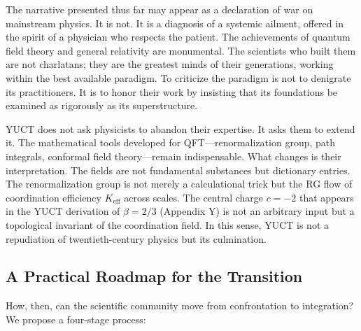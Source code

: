\documentclass[12pt,a4paper]{article}
\begin{document}
	The narrative presented thus far may appear as a declaration of war on mainstream physics. It is not. It is a diagnosis of a systemic ailment, offered in the spirit of a physician who respects the patient. The achievements of quantum field theory and general relativity are monumental. The scientists who built them are not charlatans; they are the greatest minds of their generations, working within the best available paradigm. To criticize the paradigm is not to denigrate its practitioners. It is to honor their work by insisting that its foundations be examined as rigorously as its superstructure.
	
	YUCT does not ask physicists to abandon their expertise. It asks them to extend it. The mathematical tools developed for QFT—renormalization group, path integrals, conformal field theory—remain indispensable. What changes is their interpretation. The fields are not fundamental substances but dictionary entries. The renormalization group is not merely a calculational trick but the RG flow of coordination efficiency \(K_{\mathrm{eff}}\) across scales. The central charge \(c = -2\) that appears in the YUCT derivation of \(\beta = 2/3\) (Appendix Y) is not an arbitrary input but a topological invariant of the coordination field. In this sense, YUCT is not a repudiation of twentieth-century physics but its culmination.
	
	\subsection{A Practical Roadmap for the Transition}
	
	How, then, can the scientific community move from confrontation to integration? We propose a four-stage process:
	
\end{document}
